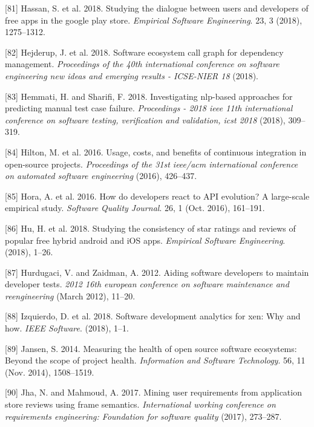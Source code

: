 \documentclass[]{book}
\begin{document}
\hypertarget{ref-hassan2018studying}{}
{[}81{]} Hassan, S. et al. 2018. Studying the dialogue between users and
developers of free apps in the google play store. \emph{Empirical
Software Engineering}. 23, 3 (2018), 1275--1312.

\hypertarget{ref-Hejderup2018}{}
{[}82{]} Hejderup, J. et al. 2018. Software ecosystem call graph for
dependency management. \emph{Proceedings of the 40th international
conference on software engineering new ideas and emerging results -
ICSE-NIER 18} (2018).

\hypertarget{ref-hemmati2018}{}
{[}83{]} Hemmati, H. and Sharifi, F. 2018. Investigating nlp-based
approaches for predicting manual test case failure. \emph{Proceedings -
2018 ieee 11th international conference on software testing,
verification and validation, icst 2018} (2018), 309--319.

\hypertarget{ref-hilton2016usage}{}
{[}84{]} Hilton, M. et al. 2016. Usage, costs, and benefits of
continuous integration in open-source projects. \emph{Proceedings of the
31st ieee/acm international conference on automated software
engineering} (2016), 426--437.

\hypertarget{ref-Hora2016}{}
{[}85{]} Hora, A. et al. 2016. How do developers react to API evolution?
A large-scale empirical study. \emph{Software Quality Journal}. 26, 1
(Oct. 2016), 161--191.

\hypertarget{ref-hu2018studying}{}
{[}86{]} Hu, H. et al. 2018. Studying the consistency of star ratings
and reviews of popular free hybrid android and iOS apps. \emph{Empirical
Software Engineering}. (2018), 1--26.

\hypertarget{ref-hurdugaci2012}{}
{[}87{]} Hurdugaci, V. and Zaidman, A. 2012. Aiding software developers
to maintain developer tests. \emph{2012 16th european conference on
software maintenance and reengineering} (March 2012), 11--20.

\hypertarget{ref-Izquierdo2018}{}
{[}88{]} Izquierdo, D. et al. 2018. Software development analytics for
xen: Why and how. \emph{IEEE Software}. (2018), 1--1.

\hypertarget{ref-Jansen2014}{}
{[}89{]} Jansen, S. 2014. Measuring the health of open source software
ecosystems: Beyond the scope of project health. \emph{Information and
Software Technology}. 56, 11 (Nov. 2014), 1508--1519.

\hypertarget{ref-jha2017mining}{}
{[}90{]} Jha, N. and Mahmoud, A. 2017. Mining user requirements from
application store reviews using frame semantics. \emph{International
working conference on requirements engineering: Foundation for software
quality} (2017), 273--287.
\end{document}
